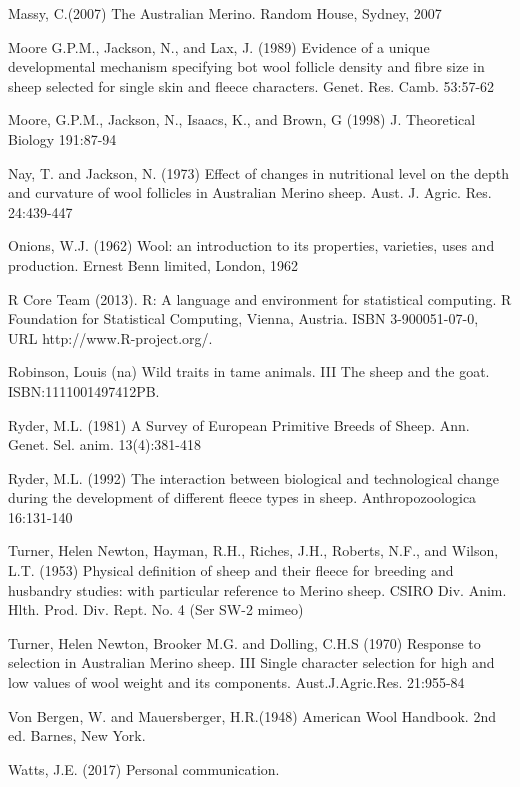 \documentclass[titlepage]{article}  %
\begin{document}
\begin{thebibliography}{99}
Massy, C.(2007) The Australian Merino. Random House, Sydney, 2007

Moore G.P.M., Jackson, N., and Lax, J. (1989) Evidence of a unique developmental mechanism specifying bot wool follicle density and fibre size in sheep selected for single skin and fleece characters. Genet. Res. Camb. 53:57-62

Moore, G.P.M., Jackson, N., Isaacs, K., and Brown, G (1998) J. Theoretical Biology 191:87-94


Nay, T. and Jackson, N. (1973) Effect of changes in nutritional level on the depth and curvature of wool follicles in Australian Merino sheep. Aust. J. Agric. Res. 24:439-447

Onions, W.J. (1962) Wool: an introduction to its properties, varieties, uses
     and production. Ernest Benn limited, London, 1962

R Core Team (2013). R: A language and environment for statistical
  computing. R Foundation for Statistical Computing, Vienna, Austria.
  ISBN 3-900051-07-0, URL http://www.R-project.org/.

Robinson, Louis (na) Wild traits in tame animals. III The sheep and the goat. ISBN:1111001497412PB.

Ryder, M.L. (1981) A Survey of European Primitive Breeds of Sheep. Ann. Genet. Sel. anim. 13(4):381-418

Ryder, M.L. (1992) The interaction between biological and technological change during the development of different fleece types in sheep. Anthropozoologica 16:131-140

Turner, Helen Newton, Hayman, R.H., Riches, J.H., Roberts, N.F., and Wilson, L.T. (1953) Physical definition of sheep and their fleece for breeding and husbandry studies: with particular reference to Merino sheep. CSIRO Div. Anim. Hlth. Prod. Div. Rept. No. 4 (Ser SW-2 mimeo)


Turner, Helen Newton, Brooker M.G. and Dolling, C.H.S (1970) Response to selection in Australian Merino sheep. III Single character selection for high and low values of wool weight and its components. Aust.J.Agric.Res. 21:955-84

Von Bergen, W. and Mauersberger, H.R.(1948) American Wool Handbook. 2nd ed. Barnes, New York.

Watts, J.E. (2017) Personal communication.
\end{thebibliography}
\end{document}
